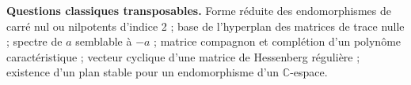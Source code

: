 \documentclass[11pt,a4paper]{article}
\begin{document}
\textbf{Questions classiques transposables.} Forme réduite des endomorphismes de carré nul ou nilpotents d'indice 2 ; base de l'hyperplan des matrices de trace nulle ; spectre de \(a\) semblable à \(-a\) ; matrice compagnon et complétion d'un polynôme caractéristique ; vecteur cyclique d'une matrice de Hessenberg régulière ; existence d'un plan stable pour un endomorphisme d'un \(\mathbb C\)-espace.
\end{document}
